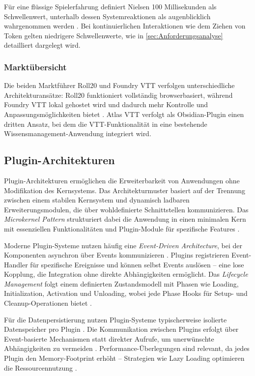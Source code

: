 Für eine flüssige Spielerfahrung definiert Nielsen 100 Millisekunden als Schwellenwert, unterhalb dessen Systemreaktionen als augenblicklich wahrgenommen werden \autocite{Nielsen1993ResponseTimes}. Bei kontinuierlichen Interaktionen wie dem Ziehen von Token gelten niedrigere Schwellenwerte, wie in \autoref{sec:Anforderungsanalyse} detailliert dargelegt wird.

\subsubsection{Marktübersicht}

Die beiden Marktführer Roll20 und Foundry VTT verfolgen unterschiedliche Architekturansätze: Roll20 funktioniert vollständig browserbasiert, während Foundry VTT lokal gehostet wird und dadurch mehr Kontrolle und Anpassungsmöglichkeiten bietet \autocite{FoundryVTT2024}. Atlas \ac{VTT} verfolgt als Obsidian-Plugin einen dritten Ansatz, bei dem die \ac{VTT}-Funktionalität in eine bestehende Wissensmanagement-Anwendung integriert wird.

\subsection{Plugin-Architekturen}
\label{subsec:PluginArchitekturen}

Plugin-Architekturen ermöglichen die Erweiterbarkeit von Anwendungen ohne Modifikation des Kernsystems. Das Architekturmuster basiert auf der Trennung zwischen einem stabilen Kernsystem und dynamisch ladbaren Erweiterungsmodulen, die über wohldefinierte Schnittstellen kommunizieren. Das \textit{Microkernel Pattern} strukturiert dabei die Anwendung in einen minimalen Kern mit essenziellen Funktionalitäten und Plugin-Module für spezifische Features \autocite[S.~24--26]{Richards2024MicrokernelArchitecture}.

Moderne Plugin-Systeme nutzen häufig eine \textit{Event-Driven Architecture}, bei der Komponenten asynchron über Events kommunizieren \autocite{Microsoft2024EventDriven}. Plugins registrieren Event-Handler für spezifische Ereignisse und können selbst Events auslösen -- eine lose Kopplung, die Integration ohne direkte Abhängigkeiten ermöglicht. Das \textit{Lifecycle Management} folgt einem definierten Zustandsmodell mit Phasen wie Loading, Initialization, Activation und Unloading, wobei jede Phase Hooks für Setup- und Cleanup-Operationen bietet \autocite{VSCodeExtensionLifecycle2024}.

Für die Datenpersistierung nutzen Plugin-Systeme typischerweise isolierte Datenspeicher pro Plugin \autocite{VSCodeExtensionLifecycle2024}. Die Kommunikation zwischen Plugins erfolgt über Event-basierte Mechanismen statt direkter Aufrufe, um unerwünschte Abhängigkeiten zu vermeiden \autocite{RefactoringGuruObserver}. Performance-Überlegungen sind relevant, da jedes Plugin den Memory-Footprint erhöht -- Strategien wie Lazy Loading optimieren die Ressourcennutzung \autocite{JavaDesignPatternsLazyLoading}.

